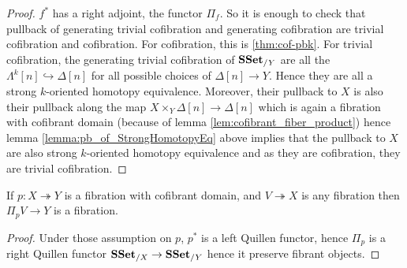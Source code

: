 \documentclass[reqno,10pt,a4paper,oneside,draft]{amsart}
\begin{document}
\begin{proof}

$f^*$ has a right adjoint, the functor $\Pi_{f}$. So it is enough to check that pullback of generating trivial cofibration and generating cofibration are trivial cofibration and cofibration. For cofibration, this is \ref{thm:cof-pbk}. For trivial cofibration, the generating trivial cofibration of $\mathbf{SSet}_{/Y}$ are all the $\Lambda^{k}[n] \hookrightarrow \Delta[n]$ for all possible choices of $\Delta[n] \rightarrow Y$. Hence they are all a strong $k$-oriented homotopy equivalence. Moreover, their pullback to $X$ is also their pullback along the map $X \times_Y \Delta[n] \rightarrow \Delta[n]$ which is again a fibration with cofibrant domain (because of lemma \ref{lem:cofibrant_fiber_product}) hence lemma \ref{lemma:pb_of_StrongHomotopyEq} above implies that the pullback to $X$ are also strong $k$-oriented homotopy equivalence and as they are cofibration, they are trivial cofibration.

\end{proof}

\begin{corollary}\label{cor:Pi_types_are_fibrant}
If $p: X \twoheadrightarrow Y$ is a fibration with cofibrant domain, and $V\twoheadrightarrow X$ is any fibration then $\Pi_p V \rightarrow Y$ is a fibration.
\end{corollary}

\begin{proof}
Under those assumption on $p$, $p^*$ is a left Quillen functor, hence $\Pi_p$ is a right Quillen functor $\mathbf{SSet}_{/X} \rightarrow \mathbf{SSet}_{/Y}$ hence it preserve fibrant objects.
\end{proof}



\end{document}
